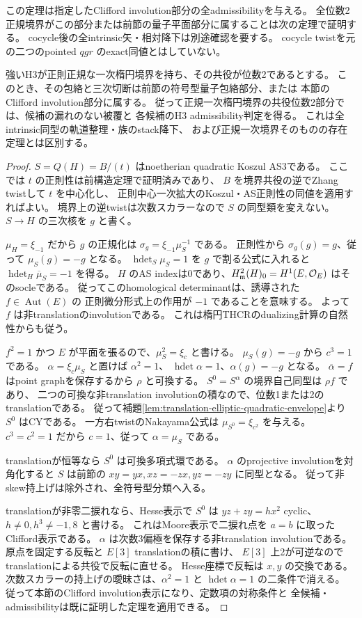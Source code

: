 この定理は指定したClifford involution部分の全admissibilityを与える。
全位数2正規境界がこの部分または前節の量子平面部分に属することは次の定理で証明する。
cocycle後の全intrinsic矢・相対降下は別途確認を要する。
cocycle twistを元の二つのpointed $qgr$ のexact同値とはしていない。

\begin{theorem}[位数2正規楕円境界の包絡被覆]
\label{thm:normal-order2-coverage}
強いH3が正則正規な一次楕円境界を持ち、その共役が位数2であるとする。
このとき、その包絡と三次切断は前節の符号型量子包絡部分、または
本節のClifford involution部分に属する。
従って正規一次楕円境界の共役位数2部分では、候補の漏れのない被覆と
各候補のH3 admissibility判定を得る。
これは全intrinsic同型の軌道整理・族のstack降下、
および正規一次境界そのものの存在定理とは区別する。
\end{theorem}
\begin{proof}
$S=Q(H)=B/(t)$ はnoetherian quadratic Koszul AS3である。
ここでは $t$ の正則性は前構造定理で証明済みであり、
$B$ を境界共役の逆でZhang twistして $t$ を中心化し、
正則中心一次拡大のKoszul・AS正則性の同値を適用すればよい。
境界上の逆twistは次数スカラーなので $S$ の同型類を変えない。
$S\to H$ の三次核を $g$ と書く。

$\mu_H=\xi_{-1}$ だから $g$ の正規化は
$\sigma_g=\xi_{-1}\mu_S^{-1}$ である。
正則性から $\sigma_g(g)=g$、従って $\mu_S(g)=-g$ となる。
$\operatorname{hdet}_S\mu_S=1$ を $g$ で割る公式に入れると
$\operatorname{hdet}_H\overline\mu_S=-1$ を得る。
$H$ のAS indexは0であり、$H^2_{\mathfrak m}(H)_0=H^1(E,\mathcal O_E)$ はそのsocleである。
従ってこのhomological determinantは、誘導された $f\in\operatorname{Aut}(E)$ の
正則微分形式上の作用が $-1$ であることを意味する。
よって $f$ は非translationのinvolutionである。
これは楕円THCRのdualizing計算の自然性からも従う。

$f^2=1$ かつ $E$ が平面を張るので、$\mu_S^2=\xi_c$ と書ける。
$\mu_S(g)=-g$ から $c^3=1$ である。
$\alpha=\xi_c\mu_S$ と置けば $\alpha^2=1$、
$\operatorname{hdet}\alpha=1$、$\alpha(g)=-g$ となる。
$\overline\alpha=f$ はpoint graphを保存するから $\rho$ と可換する。
$S^0=S^\alpha$ の境界自己同型は $\rho f$ であり、
二つの可換な非translation involutionの積なので、位数1または2のtranslationである。
従って補題\ref{lem:translation-elliptic-quadratic-envelope}より $S^0$ はCYである。
一方右twistのNakayama公式は $\mu_{S^0}=\xi_{c^2}$ を与える。
$c^3=c^2=1$ だから $c=1$、従って $\alpha=\mu_S$ である。

translationが恒等なら $S^0$ は可換多項式環である。
$\alpha$ のprojective involutionを対角化すると
$S$ は前節の $xy=yx,xz=-zx,yz=-zy$ に同型となる。
従って非skew持上げは除外され、全符号型分類へ入る。

translationが非零二捩れなら、Hesse表示で $S^0$ は
$yz+zy=hx^2$ cyclic、$h\ne0,h^3\ne-1,8$ と書ける。
これはMoore表示で二捩れ点を $a=b$ に取ったClifford表示である。
$\alpha$ は次数3偏極を保存する非translation involutionである。
原点を固定する反転と $E[3]$ translationの積に書け、
$E[3]$ 上2が可逆なのでtranslationによる共役で反転に直せる。
Hesse座標で反転は $x,y$ の交換である。
次数スカラーの持上げの曖昧さは、$\alpha^2=1$ と
$\operatorname{hdet}\alpha=1$ の二条件で消える。
従って本節のClifford involution表示になり、定数項の対称条件と
全候補・admissibilityは既に証明した定理を適用できる。
\end{proof}
